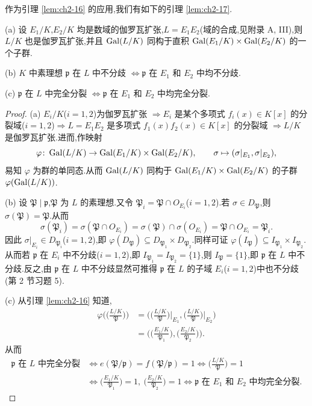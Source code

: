 作为引理 \ref{lem:ch2-16} 的应用,我们有如下的引理 \ref{lem:ch2-17}.

\begin{lemma}\label{lem:ch2-17}
(a) 设 $E_1/K$,$E_2/K$ 均是数域的伽罗瓦扩张,$L=E_1E_2$(域的合成,见附录 A, III),则 $L/K$ 也是伽罗瓦扩张,并且 $\operatorname{Gal}(L/K)$ 同构于直积 $\operatorname{Gal}(E_1/K)\times\operatorname{Gal}(E_2/K)$ 的一个子群.

(b) $K$ 中素理想 $\mathfrak{p}$ 在 $L$ 中不分歧 $\Leftrightarrow\mathfrak{p}$ 在 $E_1$ 和 $E_2$ 中均不分歧.

(c) $\mathfrak{p}$ 在 $L$ 中完全分裂 $\Leftrightarrow\mathfrak{p}$ 在 $E_1$ 和 $E_2$ 中均完全分裂.
\end{lemma}

\begin{proof}
(a) $E_i/K$($i=1,2$)为伽罗瓦扩张 $\Rightarrow E_i$ 是某个多项式 $f_i(x)\in K[x]$ 的分裂域($i=1,2$)$\Rightarrow L=E_1E_2$ 是多项式 $f_1(x)f_2(x)\in K[x]$ 的分裂域 $\Rightarrow L/K$ 是伽罗瓦扩张.进而,作映射
\[
  \varphi\colon\operatorname{Gal}(L/K)\to\operatorname{Gal}(E_1/K)\times\operatorname{Gal}(E_2/K),\qquad
  \sigma\mapsto(\sigma|_{E_1},\sigma|_{E_2}),
\]
易知 $\varphi$ 为群的单同态.从而 $\operatorname{Gal}(L/K)$ 同构于 $\operatorname{Gal}(E_1/K)\times\operatorname{Gal}(E_2/K)$ 的子群 $\varphi(\operatorname{Gal}(L/K))$.

(b) 设 $\mathfrak{P}\mid\mathfrak{p}$,$\mathfrak{P}$ 为 $L$ 的素理想.又令 $\mathfrak{P}_i=\mathfrak{P}\cap O_{E_i}$($i=1,2$).若 $\sigma\in D_{\mathfrak{P}}$,则 $\sigma(\mathfrak{P})=\mathfrak{P}$.从而
\[
  \sigma(\mathfrak{P}_i)=\sigma(\mathfrak{P}\cap O_{E_i})=\sigma(\mathfrak{P})\cap\sigma(O_{E_i})=\mathfrak{P}\cap O_{E_i}=\mathfrak{P}_i.
\]
因此 $\sigma|_{E_i}\in D_{\mathfrak{P}_i}$($i=1,2$),即 $\varphi(D_{\mathfrak{P}})\subseteq D_{\mathfrak{P}_1}\times D_{\mathfrak{P}_2}$.同样可证 $\varphi(I_{\mathfrak{P}})\subseteq I_{\mathfrak{P}_1}\times I_{\mathfrak{P}_2}$.从而若 $\mathfrak{p}$ 在 $E_i$ 中不分歧($i=1,2$),即 $I_{\mathfrak{P}_1}=I_{\mathfrak{P}_2}=\{1\}$,则 $I_{\mathfrak{P}}=\{1\}$,即 $\mathfrak{p}$ 在 $L$ 中不分歧.反之,由 $\mathfrak{p}$ 在 $L$ 中不分歧显然可推得 $\mathfrak{p}$ 在 $L$ 的子域 $E_i$($i=1,2$)中也不分歧(第 2 节习题 5).

(c) 从引理 \ref{lem:ch2-16} 知道,
\begin{align*}
  \varphi\Big(\Big(\frac{L/K}{\mathfrak{P}}\Big)\Big)
  &=\Big(\Big(\frac{L/K}{\mathfrak{P}}\Big)\Big|_{E_1},\Big(\frac{L/K}{\mathfrak{P}}\Big)\Big|_{E_2}\Big)\\
  &=\Big(\Big(\frac{E_1/K}{\mathfrak{P}_1}\Big),\Big(\frac{E_2/K}{\mathfrak{P}_2}\Big)\Big).
\end{align*}
从而
\begin{align*}
  \mathfrak{p}\text{ 在 }L\text{ 中完全分裂}
  &\Leftrightarrow e(\mathfrak{P}/\mathfrak{p})=f(\mathfrak{P}/\mathfrak{p})=1
  \Leftrightarrow\Big(\frac{L/K}{\mathfrak{P}}\Big)=1\\
  &\Leftrightarrow\Big(\frac{E_1/K}{\mathfrak{P}_1}\Big)=1,\ \Big(\frac{E_2/K}{\mathfrak{P}_2}\Big)=1
  \Leftrightarrow\mathfrak{p}\text{ 在 }E_1\text{ 和 }E_2\text{ 中均完全分裂}.
\end{align*}
\end{proof}

